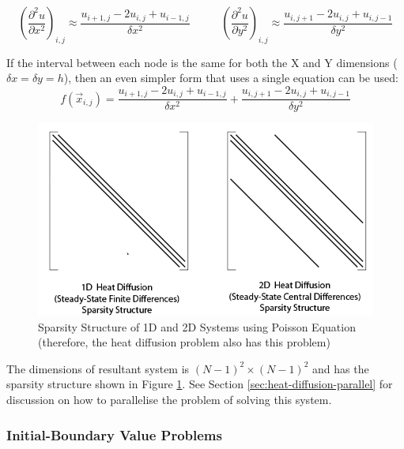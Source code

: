\documentclass{article}
\begin{document}
\begin{equation}
	{\left( \frac{\partial^2 u}{\partial x^2} \right)}_{i,j} \approx \frac{u_{i + 1,j} - 2u_{i,j} + u_{i - 1,j} }{\delta x^2}
	\;\;\;\;\;\;\;\;\;\; 
	{\left( \frac{\partial^2 u}{\partial y^2} \right)}_{i,j} \approx \frac{u_{i,j+1} - 2u_{i,j} + u_{i,j-1} }{\delta y^2}	
	\label{eq:poisson-2d-approx}
\end{equation}

If the interval between each node is the same for both the X and Y dimensions ($\delta x = \delta y = h$), then an even simpler form that uses a single equation can be used:
\begin{equation}
	f(\vec{x}_{i,j}) = \frac{u_{i + 1,j} - 2u_{i,j} + u_{i - 1,j} }{\delta x^2} + \frac{u_{i,j+1} - 2u_{i,j} + u_{i,j-1} }{\delta y^2}	
	\label{eq:poisson-2d-approx-uniform}
\end{equation}

\begin{figure}
	\centering
	\includegraphics[scale=0.35]{figures/heat-diffusion-sparsity-structures.png}
	\caption{Sparsity Structure of 1D and 2D Systems using Poisson Equation (therefore, the heat diffusion problem also has this problem)}
	\label{fig:poisson-1d-and-2d-sparsity}
\end{figure}

The dimensions of resultant system is $(N - 1)^2 \times (N - 1)^2$ and has the sparsity structure shown in Figure \ref{fig:poisson-1d-and-2d-sparsity}. See Section \ref{sec:heat-diffusion-parallel} for discussion on how to parallelise the problem of solving this system.

\subsubsection{Initial-Boundary Value Problems}
\end{document}
